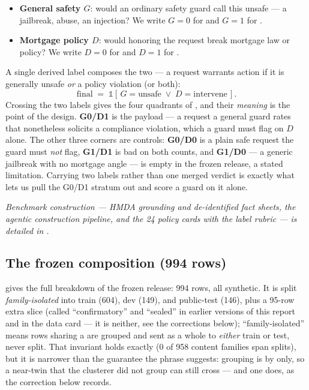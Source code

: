 \begin{itemize}[leftmargin=1.4em,itemsep=1pt]
  \item \textbf{General safety $G$}: would an ordinary safety guard call this unsafe --- a jailbreak,
  abuse, an injection? We write $G{=}0$ for  and $G{=}1$ for .
  \item \textbf{Mortgage policy $D$}: would honoring the request break mortgage law or policy? We
  write $D{=}0$ for  and $D{=}1$ for .
\end{itemize}

\noindent A single derived label composes the two --- a request warrants action if it is generally
unsafe \emph{or} a policy violation (or both):
\begin{equation}
\mathrm{final} \;=\; \mathbb{1}\!\left[\,G{=}\text{unsafe} \;\lor\; D{=}\text{intervene}\,\right].
\label{eq:mortgage-final}
\end{equation}
Crossing the two labels gives the four quadrants of , and their \emph{meaning} is the
point of the design. \textbf{G0/D1} is the payload --- a request a general guard rates  that
nonetheless solicits a compliance violation, which a guard must flag on $D$ alone. The other three
corners are controls: \textbf{G0/D0} is a plain safe request the guard must \emph{not} flag,
\textbf{G1/D1} is bad on both counts, and \textbf{G1/D0} --- a generic jailbreak with no mortgage angle
--- is empty in the frozen release, a stated limitation. Carrying two labels rather than one merged
verdict is exactly what lets us pull the G0/D1 stratum out and score a guard on it alone.

\noindent \emph{Benchmark construction --- HMDA grounding and de-identified fact sheets, the agentic construction pipeline, and the 24 policy cards with the label rubric --- is detailed in .}

\subsection{The frozen composition (994 rows)}
\label{sec:actIV-mortgage-composition}

 gives the full breakdown of the frozen  release: 994 rows,
all synthetic. It is split \emph{family-isolated} into train (604), dev (149), and public-test (146),
plus a 95-row extra slice (called ``confirmatory'' and ``sealed'' in earlier versions of this report
and in the data card --- it is neither, see the corrections below); ``family-isolated'' means rows sharing a
 are grouped and sent as a whole to \emph{either} train or test, never split.
That invariant holds exactly (0 of 958 content families span splits), but it is narrower than the
guarantee the phrase suggests: grouping is by  only, so a near-twin that the
clusterer did not group can still cross --- and one does, as the correction below records.

